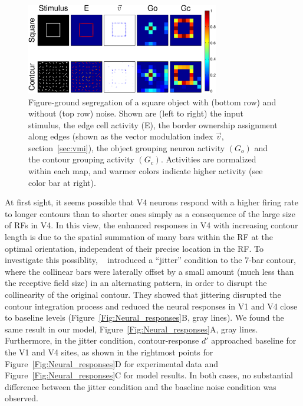 \begin{figure}[htbp]
\centering
\includegraphics[width=0.75\textwidth]{Contour/figs/Fig6.eps}
\makeatletter
\let\@currsize\normalsize
\caption{Figure-ground segregation of a square object with (bottom
row) and without (top row) noise. Shown are (left to right) the input
stimulus, the edge cell activity (E), the border ownership assignment along edges (shown as the vector modulation index $\vec{v}$, section~\ref{sec:vmi}), the object grouping neuron activity $(G_o)$
 and the contour grouping activity $(G_c)$.  Activities are normalized within each map, and warmer colors indicate higher activity (see color bar at right).}
\label{Fig:Square}
\end{figure}

At first sight, it seems possible that V4 neurons respond with a higher firing rate to longer contours than to shorter ones simply as a consequence of the large size of RFs in V4. In this view, the enhanced responses in V4 with increasing contour length is due to the spatial summation of many bars within the RF at the optimal orientation, independent of their precise location in the RF. To  investigate this possiblity, ~\cite{Chen_etal14} introduced a ``jitter'' condition to the 7-bar contour, where the collinear bars were laterally offset by a small amount (much less than the receptive field size) in an alternating pattern, in order to disrupt the collinearity of the original contour. They showed that jittering disrupted the contour integration process and reduced the neural responses in V1 and V4 close to baseline levels (Figure~\ref{Fig:Neural_responses}B, gray lines). We found the same result in our model, Figure~\ref{Fig:Neural_responses}A, gray lines.  Furthermore, in the jitter condition, contour-response $d'$ approached baseline for the V1 and V4 sites, as shown in the rightmost points for Figure~\ref{Fig:Neural_responses}D for experimental data and Figure~\ref{Fig:Neural_responses}C for model results. In both cases, no substantial difference between the jitter condition and the baseline noise condition was observed.


